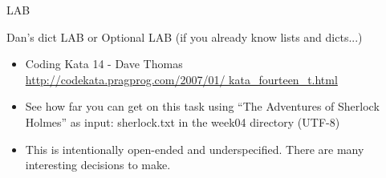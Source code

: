 \documentclass{beamer}
\begin{document}
\begin{frame}{LAB}

\vfill
{\LARGE Dan's dict LAB
\vfill
or
\vfill
Optional LAB (if you already know lists and dicts...)
}

\begin{itemize}
  \item Coding Kata 14 - Dave Thomas \\
    \url{http://codekata.pragprog.com/2007/01/ kata_fourteen_t.html}
  \item See how far you can get on this task using “The Adventures of Sherlock Holmes” as input: sherlock.txt in the week04 directory (UTF-8)
  \item  This is intentionally open-ended and underspecified. There are many interesting decisions to make.
\end{itemize}

\end{frame}

%
%
% 
\end{document}
